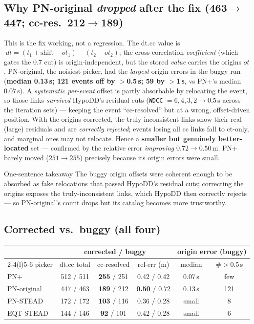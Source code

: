 \documentclass[11pt]{article}
\begin{document}
\subsection{Why PN-original \emph{dropped} after the fix (463$\rightarrow$447; cc-res.\ 212$\rightarrow$189)}

This is the fix working, not a regression. The dt.cc value is
$\;dt = (t_1+\text{shift}-ot_1) - (t_2-ot_2)$; the cross-correlation \emph{coefficient} (which gates the
0.7 cut) is origin-independent, but the stored \emph{value} carries the origins $ot$. PN-original, the
noisiest picker, had the \emph{largest} origin errors in the buggy run (\textbf{median 0.13\,s; 121
events off by $>$0.5\,s; 59 by $>$1\,s}, vs PN+'s median 0.07\,s). A \emph{systematic per-event} offset
is partly absorbable by relocating the event, so those links \emph{survived} HypoDD's residual cuts
(\texttt{WDCC} $= 6,4,3,2\rightarrow0.5$\,s across the iteration sets) --- keeping the event
``cc-resolved'' but at a wrong, offset-driven position. With the origins corrected, the truly
inconsistent links show their real (large) residuals and are \emph{correctly rejected}; events losing all
cc links fall to ct-only, and marginal ones may not relocate. Hence a \textbf{smaller but genuinely
better-located} set --- confirmed by the relative error \emph{improving} $0.72\rightarrow0.50$\,m. PN+
barely moved ($251\rightarrow255$) precisely because its origin errors were small.

\begin{keybox}{One-sentence takeaway}
The buggy origin offsets were coherent enough to be absorbed as fake relocations that passed HypoDD's
residual cuts; correcting the origins exposes the truly-inconsistent links, which HypoDD then correctly
rejects --- so PN-original's count drops but its catalog becomes more trustworthy.
\end{keybox}

\subsection{Corrected vs.\ buggy (all four)}

\begin{center}
\small
\begin{tabular}{@{}lccc@{\hskip 8mm}cc@{}}
\toprule
& \multicolumn{3}{c}{\textbf{corrected} / buggy} & \multicolumn{2}{c}{origin error (buggy)} \\
\cmidrule(lr){2-4}\cmidrule(l){5-6}
picker & dt.cc total & cc-resolved & rel-err (m) & median & \#$>$0.5\,s \\
\midrule
PN+          & 512 / 511 & \textbf{255} / 251 & 0.42 / 0.42 & 0.07\,s & few \\
PN-original  & 447 / 463 & \textbf{189} / 212 & \textbf{0.50} / 0.72 & 0.13\,s & 121 \\
PN-STEAD     & 172 / 172 & \textbf{103} / 116 & 0.36 / 0.28 & small & 8 \\
EQT-STEAD    & 144 / 146 & \textbf{92}  / 101 & 0.42 / 0.28 & small & 6 \\
\bottomrule
\end{tabular}
\end{center}
\end{document}
